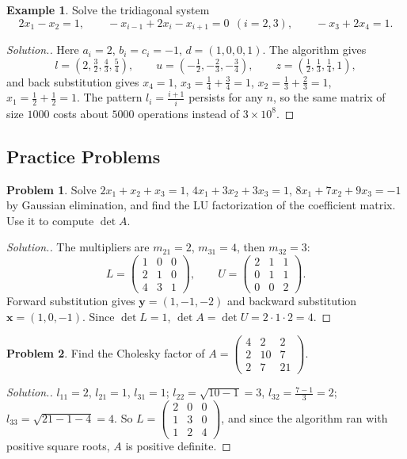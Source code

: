 \documentclass[11pt,a4paper]{article}
\numberwithin{equation}{section}
\theoremstyle{definition}
\newtheorem{exa}[thm]{Example}
\newtheorem{problemx}{Problem}[subsection]
\newenvironment{problem}{\begin{problemx}}{\end{problemx}}
\newenvironment{solution}
  {\renewcommand{\qedsymbol}{}\begin{proof}[\textit{Solution}.]}
  {\end{proof}}
\begin{document}
\begin{exa}
\label{exa:thomas}
Solve the tridiagonal system
$$2x_1-x_2 = 1,\qquad -x_{i-1}+2x_i-x_{i+1} = 0\ \ (i = 2,3),\qquad -x_3+2x_4 = 1 .$$
\end{exa}

\begin{solution}
Here $a_i = 2$, $b_i = c_i = -1$, $d = (1,0,0,1)$. The algorithm gives
$$l = \left(2,\tfrac32,\tfrac43,\tfrac54\right),\qquad u = \left(-\tfrac12,-\tfrac23,-\tfrac34\right),\qquad z = \left(\tfrac12,\tfrac13,\tfrac14,1\right),$$
and back substitution gives $x_4 = 1$, $x_3 = \frac14+\frac34 = 1$, $x_2 = \frac13+\frac23 = 1$, $x_1 = \frac12+\frac12 = 1$. The pattern
$l_i = \frac{i+1}{i}$ persists for any $n$, so the same matrix of size $1000$ costs about $5000$ operations instead of $3\times10^8$.
\end{solution}


\subsection{Practice Problems}

\begin{problem}
Solve $2x_1+x_2+x_3 = 1$, $4x_1+3x_2+3x_3 = 1$, $8x_1+7x_2+9x_3 = -1$ by Gaussian elimination, and find the LU factorization of the coefficient
matrix. Use it to compute $\det A$.
\end{problem}
\begin{solution}
The multipliers are $m_{21} = 2$, $m_{31} = 4$, then $m_{32} = 3$:
$$L = \begin{pmatrix}1&0&0\\2&1&0\\4&3&1\end{pmatrix},\qquad U = \begin{pmatrix}2&1&1\\0&1&1\\0&0&2\end{pmatrix}.$$
Forward substitution gives $\mathbf y = (1,-1,-2)$ and backward substitution $\mathbf x = (1,0,-1)$. Since $\det L = 1$,
$\det A = \det U = 2\cdot1\cdot2 = 4$.
\end{solution}

\begin{problem}
Find the Cholesky factor of $A = \begin{pmatrix}4&2&2\\2&10&7\\2&7&21\end{pmatrix}$.
\end{problem}
\begin{solution}
$l_{11} = 2$, $l_{21} = 1$, $l_{31} = 1$; $l_{22} = \sqrt{10-1} = 3$, $l_{32} = \frac{7-1}{3} = 2$; $l_{33} = \sqrt{21-1-4} = 4$. So
$L = \begin{pmatrix}2&0&0\\1&3&0\\1&2&4\end{pmatrix}$, and since the algorithm ran with positive square roots, $A$ is positive definite.
\end{solution}
\end{document}

